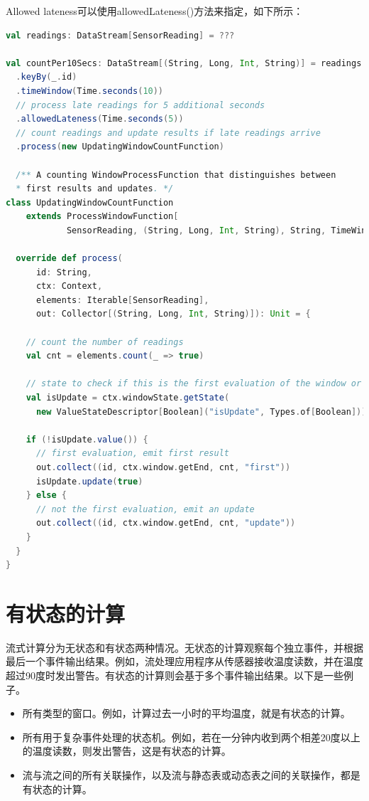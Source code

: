 \documentclass[oneside]{ctexbook}
\begin{document}
Allowed lateness可以使用allowedLateness()方法来指定，如下所示：

\begin{lstlisting}[language=scala]
val readings: DataStream[SensorReading] = ???

val countPer10Secs: DataStream[(String, Long, Int, String)] = readings
  .keyBy(_.id)
  .timeWindow(Time.seconds(10))
  // process late readings for 5 additional seconds
  .allowedLateness(Time.seconds(5))
  // count readings and update results if late readings arrive
  .process(new UpdatingWindowCountFunction)

  /** A counting WindowProcessFunction that distinguishes between 
  * first results and updates. */
class UpdatingWindowCountFunction
    extends ProcessWindowFunction[
            SensorReading, (String, Long, Int, String), String, TimeWindow] {

  override def process(
      id: String,
      ctx: Context,
      elements: Iterable[SensorReading],
      out: Collector[(String, Long, Int, String)]): Unit = {

    // count the number of readings
    val cnt = elements.count(_ => true)

    // state to check if this is the first evaluation of the window or not
    val isUpdate = ctx.windowState.getState(
      new ValueStateDescriptor[Boolean]("isUpdate", Types.of[Boolean]))

    if (!isUpdate.value()) {
      // first evaluation, emit first result
      out.collect((id, ctx.window.getEnd, cnt, "first"))
      isUpdate.update(true)
    } else {
      // not the first evaluation, emit an update
      out.collect((id, ctx.window.getEnd, cnt, "update"))
    }
  }
}

\end{lstlisting}

\chapter{有状态的计算}

流式计算分为无状态和有状态两种情况。无状态的计算观察每个独立事件，并根据最后一个事件输出结果。例如，流处理应用程序从传感器接收温度读数，并在温度超过90度时发出警告。有状态的计算则会基于多个事件输出结果。以下是一些例子。

\begin{itemize}
\item 所有类型的窗口。例如，计算过去一小时的平均温度，就是有状态的计算。
\item 所有用于复杂事件处理的状态机。例如，若在一分钟内收到两个相差20度以上的温度读数，则发出警告，这是有状态的计算。
\item 流与流之间的所有关联操作，以及流与静态表或动态表之间的关联操作，都是有状态的计算。
\end{itemize}
\end{document}
